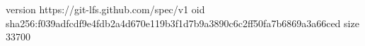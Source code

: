 version https://git-lfs.github.com/spec/v1
oid sha256:f039adfcdf9e4fdb2a4d670e119b3f1d7b9a3890c6c2ff50fa7b6869a3a66ced
size 33700
